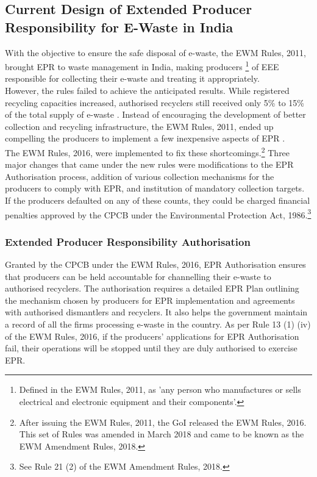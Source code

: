 \documentclass[a4paper, 12pt]{article}
\begin{document}
                    \subsection{Current Design of Extended Producer Responsibility for E-Waste in India}
                    
                    With the objective to ensure the safe disposal of e-waste, the EWM Rules, 2011, brought EPR to waste management in India, making producers \footnote{Defined in the EWM Rules, 2011, as 'any person who manufactures or sells electrical and electronic equipment and their components'.} of EEE responsible for collecting their e-waste and treating it appropriately. \\
                    
                    However, the rules failed to achieve the anticipated results. While registered recycling capacities increased, authorised recyclers still received only 5\% to 15\% of the total supply of e-waste \parencite{bhaskarturagapapera}. Instead of encouraging the development of better collection and recycling infrastructure, the EWM Rules, 2011, ended up compelling the producers to implement a few inexpensive aspects of EPR \parencite{bhaskarturagapapera}. \\
                    
                    The EWM Rules, 2016, were implemented to fix these shortcomings.\footnote{After issuing the EWM Rules, 2011, the GoI released the EWM Rules, 2016. This set of Rules was amended in March 2018 and came to be known as the EWM Amendment Rules, 2018.} Three major changes that came under the new rules were modifications to the EPR Authorisation process, addition of various collection mechanisms for the producers to comply with EPR, and institution of mandatory collection targets. If the producers defaulted on any of these counts, they could be charged financial penalties approved by the CPCB under the Environmental Protection Act, 1986.\footnote{See Rule 21 (2) of the EWM Amendment Rules, 2018.}
                    
                    \subsubsection{Extended Producer Responsibility Authorisation}
                    
                    Granted by the CPCB under the EWM Rules, 2016, EPR Authorisation ensures that producers can be held accountable for channelling their e-waste to authorised recyclers. The authorisation requires a detailed EPR Plan outlining the mechanism chosen by producers for EPR implementation and agreements with authorised dismantlers and recyclers. It also helps the government maintain a record of all the firms processing e-waste in the country. As per Rule 13 (1) (iv) of the EWM Rules, 2016, if the producers’ applications for EPR Authorisation fail, their operations will be stopped until they are duly authorised to exercise EPR. 
                                         
\end{document}
